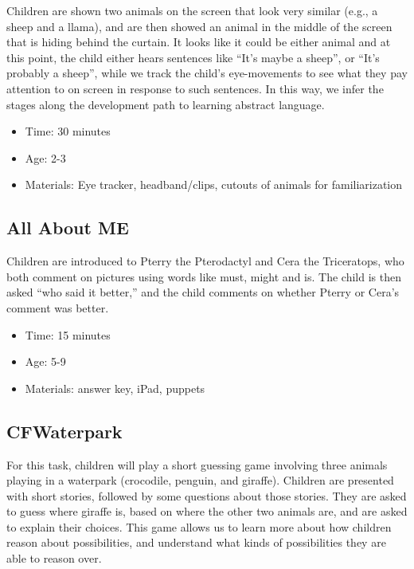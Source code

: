 \documentclass[
]{book}
\providecommand{\tightlist}{%
  \setlength{\itemsep}{0pt}\setlength{\parskip}{0pt}}
\begin{document}
Children are shown two animals on the screen that look very similar (e.g., a sheep and a llama), and are then showed an animal in the middle of the screen that is hiding behind the curtain. It looks like it could be either animal and at this point, the child either hears sentences like ``It's maybe a sheep'', or ``It's probably a sheep'', while we track the child's eye-movements to see what they pay attention to on screen in response to such sentences. In this way, we infer the stages along the development path to learning abstract language.

\begin{itemize}
\tightlist
\item
  Time: 30 minutes
\item
  Age: 2-3
\item
  Materials: Eye tracker, headband/clips, cutouts of animals for familiarization
\end{itemize}

\hypertarget{all-about-me}{%
\subsection*{All About ME}\label{all-about-me}}

Children are introduced to Pterry the Pterodactyl and Cera the Triceratops, who both comment on pictures using words like must, might and is. The child is then asked ``who said it better,'' and the child comments on whether Pterry or Cera's comment was better.

\begin{itemize}
\tightlist
\item
  Time: 15 minutes
\item
  Age: 5-9
\item
  Materials: answer key, iPad, puppets
\end{itemize}

\hypertarget{cfwaterpark}{%
\subsection*{CFWaterpark}\label{cfwaterpark}}

For this task, children will play a short guessing game involving three animals playing in a waterpark (crocodile, penguin, and giraffe). Children are presented with short stories, followed by some questions about those stories. They are asked to guess where giraffe is, based on where the other two animals are, and are asked to explain their choices. This game allows us to learn more about how children reason about possibilities, and understand what kinds of possibilities they are able to reason over.
\end{document}
